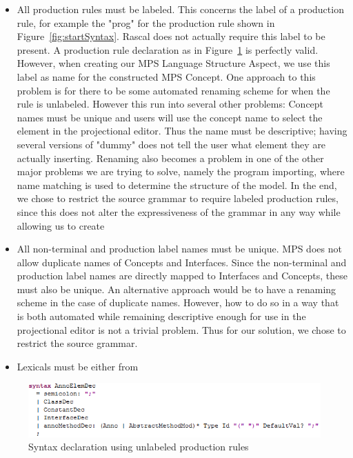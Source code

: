 \documentclass[a4paper]{article}
\begin{document}
\begin{itemize}
	\item All production rules must be labeled. This concerns the label of a production rule, for example the "prog" for the production rule shown in Figure~\ref{fig:startSyntax}. Rascal does not actually require this label to be present. A production rule declaration as in Figure~\ref{fig:UL} is perfectly valid. However, when creating our MPS Language Structure Aspect, we use this label as name for the constructed MPS Concept. One approach to this problem is for there to be some automated renaming scheme for when the rule is unlabeled. However this run into several other problems: Concept names must be unique and users will use the concept name to select the element in the projectional editor. Thus the name must be descriptive; having several versions of "dummy" does not tell the user what element they are actually inserting. Renaming also becomes a problem in one of the other major problems we are trying to solve, namely the program importing, where name matching is used to determine the structure of the model. In the end, we chose to restrict the source grammar to require labeled production rules, since this does not alter the expressiveness of the grammar in any way while allowing us to create 
	\item All non-terminal and production label names must be unique. MPS does not allow duplicate names of Concepts and Interfaces. Since the non-terminal and production label names are directly mapped to Interfaces and Concepts, these must also be unique. An alternative approach would be to have a renaming scheme in the case of duplicate names. However, how to do so  in a way that is both automated while remaining descriptive enough for use in the projectional editor is not a trivial problem. Thus for our solution, we chose to restrict the source grammar.  
	\item Lexicals must be either from 
	
\end{itemize}

\begin{figure}[h]
	\centering
	\includegraphics[width=\textwidth]{images/UnlabeledProduction.png}
	\caption{Syntax declaration using unlabeled production rules}
	\label{fig:UL}
\end{figure}
\end{document}
